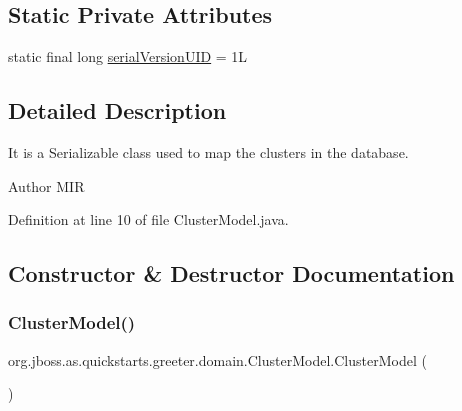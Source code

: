 \subsection*{Static Private Attributes}
\begin{DoxyCompactItemize}
\item 
static final long \hyperlink{classorg_1_1jboss_1_1as_1_1quickstarts_1_1greeter_1_1domain_1_1_cluster_model_a9838700e6ef5e06ad56a575b50fb1a1a}{serial\+Version\+U\+ID} = 1L
\end{DoxyCompactItemize}


\subsection{Detailed Description}
It is a Serializable class used to map the clusters in the database. 

\begin{DoxyAuthor}{Author}
M\+IR 
\end{DoxyAuthor}


Definition at line 10 of file Cluster\+Model.\+java.



\subsection{Constructor \& Destructor Documentation}
\mbox{\label{classorg_1_1jboss_1_1as_1_1quickstarts_1_1greeter_1_1domain_1_1_cluster_model_a3d821af353b398c137947265ecee312c}} 
\subsubsection{\texorpdfstring{Cluster\+Model()}{ClusterModel()}}
{\footnotesize\ttfamily org.\+jboss.\+as.\+quickstarts.\+greeter.\+domain.\+Cluster\+Model.\+Cluster\+Model (\begin{DoxyParamCaption}{ }\end{DoxyParamCaption})}



